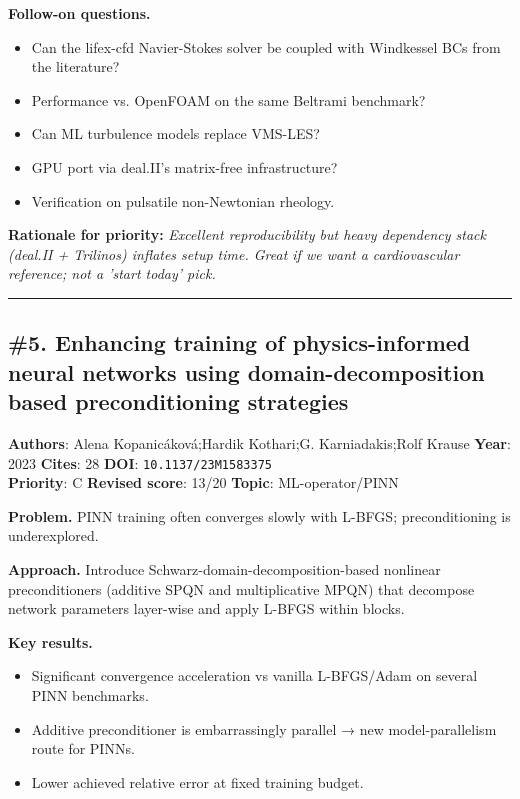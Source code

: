 \documentclass[10pt,letterpaper]{article}
\begin{document}
\textbf{Follow-on questions.}
\begin{itemize}
\item Can the lifex-cfd Navier-Stokes solver be coupled with Windkessel BCs from the literature?
\item Performance vs. OpenFOAM on the same Beltrami benchmark?
\item Can ML turbulence models replace VMS-LES?
\item GPU port via deal.II's matrix-free infrastructure?
\item Verification on pulsatile non-Newtonian rheology.
\end{itemize}

\textbf{Rationale for priority:} \emph{Excellent reproducibility but heavy dependency stack (deal.II + Trilinos) inflates setup time. Great if we want a cardiovascular reference; not a 'start today' pick.}

\medskip\hrule\medskip

\subsection*{\#5. Enhancing training of physics-informed neural networks using domain-decomposition based preconditioning strategies}
\textbf{Authors}: Alena Kopanicáková;Hardik Kothari;G. Karniadakis;Rolf Krause \textbullet{} \textbf{Year}: 2023 \textbullet{} \textbf{Cites}: 28 \textbullet{} \textbf{DOI}: \texttt{10.1137/23M1583375} \\
\textbf{Priority}: C \textbullet{} \textbf{Revised score}: 13/20 \textbullet{} \textbf{Topic}: ML-operator/PINN

\textbf{Problem.} PINN training often converges slowly with L-BFGS; preconditioning is underexplored.

\textbf{Approach.} Introduce Schwarz-domain-decomposition-based nonlinear preconditioners (additive SPQN and multiplicative MPQN) that decompose network parameters layer-wise and apply L-BFGS within blocks.

\textbf{Key results.}
\begin{itemize}
\item Significant convergence acceleration vs vanilla L-BFGS/Adam on several PINN benchmarks.
\item Additive preconditioner is embarrassingly parallel → new model-parallelism route for PINNs.
\item Lower achieved relative error at fixed training budget.
\end{itemize}
\end{document}
